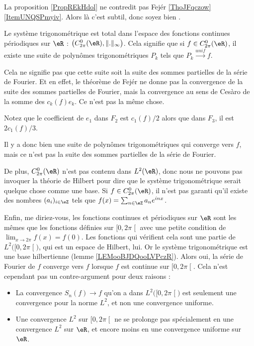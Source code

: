 \begin{normaltext}      \label{NORMooGKKWooFmOBeE}
	La proposition \ref{PropREkHdol} ne contredit pas Fejér \ref{ThoJFqczow}\ref{ItemUNQSPmyiv}. Alors là c'est subtil, donc soyez bien .

	Le système trigonométrique est total dans l'espace des fonctions continues périodiques sur \( \eR\) : \( \big(  C^0_{2\pi}(\eR),\| . \|_{\infty}\big)\). Cela signifie que si \( f\in C^0_{2\pi}(\eR)\), il  existe une suite de polynômes trigonométriques \( P_k\) tels que \( P_k\stackrel{unif}{\longrightarrow}f\).

	Cela ne signifie pas que cette suite soit la suite des sommes partielles de la série de Fourier. Et en effet, le théorème de Fejér ne donne pas la convergence de la suite des sommes partielles de Fourier, mais la convergence au sens de Cesàro de la somme des \( c_k(f)e_k\). Ce n'est pas la même chose.

	Notez que le coefficient de \( e_1\) dans \( F_2\) est \( c_1(f)/2\) alors que dans \( F_3\), il est \( 2c_1(f)/3\).

	Il y a donc bien une suite de polynômes trigonométriques qui converge vers \( f\), mais ce n'est pas la suite des sommes partielles de la série de Fourier.

	De plus, \( C^0_{2\pi}(\eR)\) n'est pas contenu dans \( L^2(\eR)\), donc nous ne pouvons pas invoquer la théorie de Hilbert pour dire que le système trigonométrique serait quelque chose comme une base. Si \( f\in C^0_{2\pi}(\eR)\), il n'est pas garanti qu'il existe des nombres \( (a_i)_{i\in \eZ}\) tels que \( f(x)=\sum_{n\in \eZ}a_n e^{inx}\).

	Enfin, me diriez-vous, les fonctions continues et périodiques sur \( \eR\) sont les mêmes que les fonctions définies sur \( \mathopen[ 0 , 2\pi \mathclose[\) avec une petite condition de \( \lim_{x\to 2\pi} f(x)=f(0)\). Les fonctions qui vérifient cela sont une partie de \( L^2\big( \mathopen[ 0 , 2\pi \mathclose[ \big)\), qui est un espace de Hilbert, lui. Or le système trigonométrique est une base hilbertienne (lemme \ref{LEMooBJDQooLVPczR}). Alors oui, la série de Fourier de \( f\) converge vers \( f\) lorsque \( f\) est continue sur \( \mathopen[ 0 , 2\pi \mathclose[\). Cela n'est cependant pas un contre-argument pour deux raisons :
	\begin{itemize}
		\item
		      La convergence \( S_n(f)\to f\) qu'on a dans \( L^2\big( \mathopen[ 0 , 2\pi \mathclose[ \big)\) est seulement une convergence pour la norme \( L^2\), et non une convergence uniforme.
		\item
		      Une convergence \( L^2\) sur \( \mathopen[ 0 , 2\pi \mathclose[\) ne se prolonge pas spécialement en une convergence \( L^2\) sur \( \eR\), et encore moins en une convergence uniforme sur \( \eR\).
	\end{itemize}
\end{normaltext}



